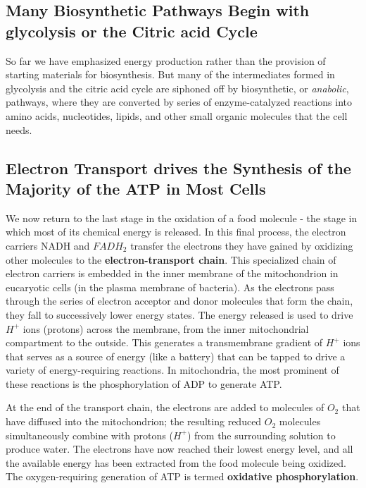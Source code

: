 \subsection{Many Biosynthetic Pathways Begin with glycolysis or the Citric acid Cycle}

So far we have emphasized
energy production rather than the provision of starting materials for biosynthesis.
But many of the intermediates formed in glycolysis and the
citric acid cycle are siphoned off by biosynthetic, or \textit{anabolic}, pathways,
where they are converted by series of enzyme-catalyzed reactions into
amino acids, nucleotides, lipids, and other small organic molecules that
the cell needs.

\subsection{Electron Transport drives the Synthesis of the Majority of the ATP in Most Cells}

We now return to the last stage in the oxidation of a food molecule -
the stage in which most of its chemical energy is released. In this final
process, the electron carriers NADH and $FADH_2$ transfer the electrons
they have gained by oxidizing other molecules to the \textbf{electron-transport chain}.
This specialized chain of electron carriers is embedded in
the inner membrane of the mitochondrion in eucaryotic cells (in the
plasma membrane of bacteria). As the electrons pass through the series
of electron acceptor and donor molecules that form the chain, they fall to
successively lower energy states. The energy released is used to drive $H^+$
ions (protons) across the membrane, from the inner mitochondrial compartment to the outside.
This generates a transmembrane gradient of $H^+$
ions that serves as a source of energy (like a battery) that can be tapped
to drive a variety of energy-requiring reactions. In mitochondria,
the most prominent of these reactions is the phosphorylation
of ADP to generate ATP.

At the end of the transport chain, the electrons are added to molecules
of $O_2$ that have diffused into the mitochondrion; the resulting reduced
$O_2$ molecules simultaneously combine with protons ($H^+$) from the surrounding
solution to produce water. The electrons have now reached
their lowest energy level, and all the available energy has been extracted
from the food molecule being oxidized. The oxygen-requiring generation
of ATP is termed \textbf{oxidative phosphorylation}.

